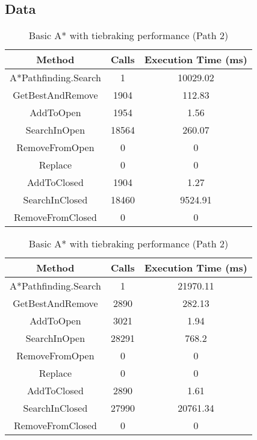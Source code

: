 \documentclass{article}
\begin{document}
  \subsection{Data}
  \begin{table}[h!]
      \parbox{.45\linewidth}{
        \centering
        \caption{Basic A* with tiebraking performance (Path 1)}
        \label{tab:tableTieBraking1}
        \begin{tabular}{c|c|c}
          \textbf{Method} & \textbf{Calls} & \textbf{Execution Time (ms)}\\
          \hline
          A*Pathfinding.Search  & 1 & 10029.02\\
          GetBestAndRemove & 1904 & 112.83\\
          AddToOpen & 1954 & 1.56\\
          SearchInOpen & 18564 & 260.07\\
          RemoveFromOpen & 0 & 0\\
          Replace & 0 & 0\\
          AddToClosed & 1904 & 1.27\\
          SearchInClosed & 18460 & 9524.91\\
          RemoveFromClosed & 0 & 0\\
        \end{tabular}
      }
      \hfil
      \parbox{.45\linewidth}{
        \centering
        \label{tab:tableTieBraking2}
        \caption{Basic A* with tiebraking performance (Path 2)}
        \begin{tabular}{c|c|c}
          \textbf{Method} & \textbf{Calls} & \textbf{Execution Time (ms)}\\
          \hline
          A*Pathfinding.Search  & 1 & 21970.11\\
          GetBestAndRemove & 2890 & 282.13\\
          AddToOpen & 3021 & 1.94\\
          SearchInOpen & 28291 & 768.2\\
          RemoveFromOpen & 0 & 0\\
          Replace & 0 & 0\\
          AddToClosed & 2890 & 1.61\\
          SearchInClosed & 27990  & 20761.34\\
          RemoveFromClosed & 0 & 0\\
        \end{tabular}
      }
  \end{table}
\end{document}
